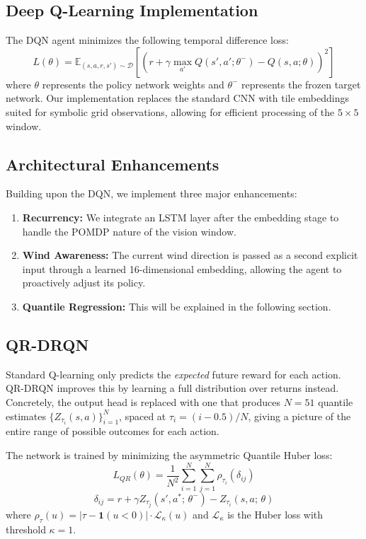 \documentclass{article}
\begin{document}
\subsection{Deep Q-Learning Implementation}
The DQN agent minimizes the following temporal difference loss:
\[
  L(\theta) = \mathbb{E}_{(s,a,r,s') \sim \mathcal{D}}\!\left[\left(r + \gamma \max_{a'} Q(s',a';\theta^{-}) - Q(s,a;\theta)\right)^{2}\right]
\]
where $\theta$ represents the policy network weights and $\theta^{-}$ represents the frozen target network. Our implementation replaces the standard CNN with tile embeddings suited for symbolic grid observations, allowing for efficient processing of the $5\times5$ window.

\subsection{Architectural Enhancements}
Building upon the DQN, we implement three major enhancements:
\begin{enumerate}
    \item \textbf{Recurrency:} We integrate an LSTM layer after the embedding stage to handle the POMDP nature of the vision window.
    \item \textbf{Wind Awareness:} The current wind direction is passed as a second explicit input through a learned 16-dimensional embedding, allowing the agent to proactively adjust its policy.
    \item \textbf{Quantile Regression:} This will be explained in the following section. 
\end{enumerate}

\subsection{QR-DRQN}
Standard Q-learning only predicts the \textit{expected} future reward for each
action. QR-DRQN improves this by learning a full distribution
over returns instead. Concretely, the output head is replaced with one that
produces $N = 51$ quantile estimates $\{Z_{\tau_i}(s, a)\}_{i=1}^{N}$,
spaced at $\tau_i = (i - 0.5) / N$, giving a picture of the entire range of
possible outcomes for each action.

The network is trained by minimizing the asymmetric Quantile Huber loss: \cite{dabney2018}
\[
  L_{QR}(\theta) = \frac{1}{N^2} \sum_{i=1}^{N}\sum_{j=1}^{N}
    \rho_{\tau_i}\!\left(\delta_{ij}\right)
\]
\[
  \delta_{ij} = r + \gamma Z_{\tau_j}(s', a^{*};\,\theta^{-}) - Z_{\tau_i}(s, a;\,\theta)
\]
where $\rho_\tau(u) = \left|\tau - \mathbf{1}(u < 0)\right| \cdot \mathcal{L}_\kappa(u)$
and $\mathcal{L}_\kappa$ is the Huber loss with threshold $\kappa=1$.
\end{document}
